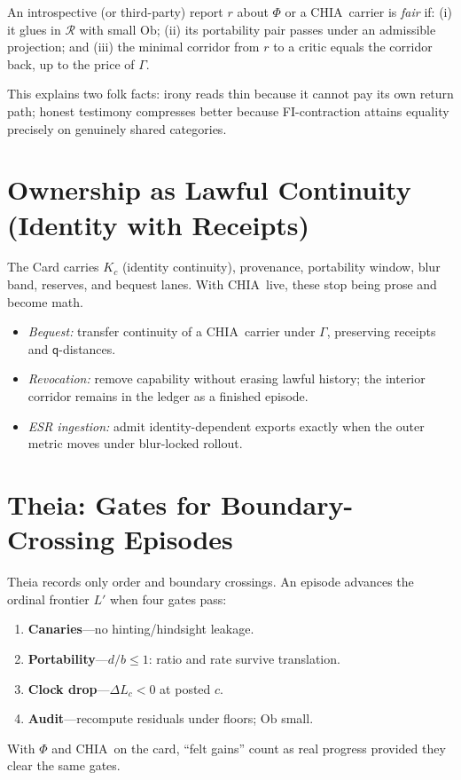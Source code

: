 \documentclass[11pt]{article}
\newcommand{\1}{\mathbf{1}}
\newcommand{\Guard}{\Gamma}
\newcommand{\Lc}{L_c}
\newcommand{\PhiField}{\Phi}
\newcommand{\Qualon}{\mathsf{q}}        %
\newcommand{\CHIA}{\textsc{CHIA}}
\newcommand{\Sheaf}{\mathscr{R}}
\newcommand{\Ob}{\mathrm{Ob}}
\newcommand{\Kc}{K_c}      %
\begin{document}
\begin{defn}
An introspective (or third-party) report \(r\) about \(\PhiField\) or a \CHIA\ carrier is \emph{fair} if: (i) it glues in \(\Sheaf\) with small \(\Ob\); (ii) its portability pair passes under an admissible projection; and (iii) the minimal corridor from \(r\) to a critic equals the corridor back, up to the price of \(\Guard\). 
\end{defn}

\noindent This explains two folk facts: irony reads thin because it cannot pay its own return path; honest testimony compresses better because FI-contraction attains equality precisely on genuinely shared categories.

\section{Ownership as Lawful Continuity (Identity with Receipts)}
The Card carries \(\Kc\) (identity continuity), provenance, portability window, blur band, reserves, and bequest lanes. With \CHIA\ live, these stop being prose and become math. 

\begin{itemize}
\item \emph{Bequest:} transfer continuity of a \CHIA\ carrier under \(\Guard\), preserving receipts and \(\Qualon\)-distances.
\item \emph{Revocation:} remove capability without erasing lawful history; the interior corridor remains in the ledger as a finished episode.
\item \emph{ESR ingestion:} admit identity-dependent exports exactly when the outer metric moves under blur-locked rollout.
\end{itemize}

\section{Theia: Gates for Boundary-Crossing Episodes}
Theia records only order and boundary crossings. An episode advances the ordinal frontier \(L'\) when four gates pass:
\begin{enumerate}[label=\textbf{C\arabic*.}]
  \item \textbf{Canaries}—no hinting/hindsight leakage.
  \item \textbf{Portability}—\(d/b\leq 1\): ratio and rate survive translation.
  \item \textbf{Clock drop}—\(\Delta \Lc<0\) at posted \(c\).
  \item \textbf{Audit}—recompute residuals under floors; \(\Ob\) small.
\end{enumerate}
With \(\PhiField\) and \CHIA\ on the card, ``felt gains'' count as real progress provided they clear the same gates. 
\end{document}
